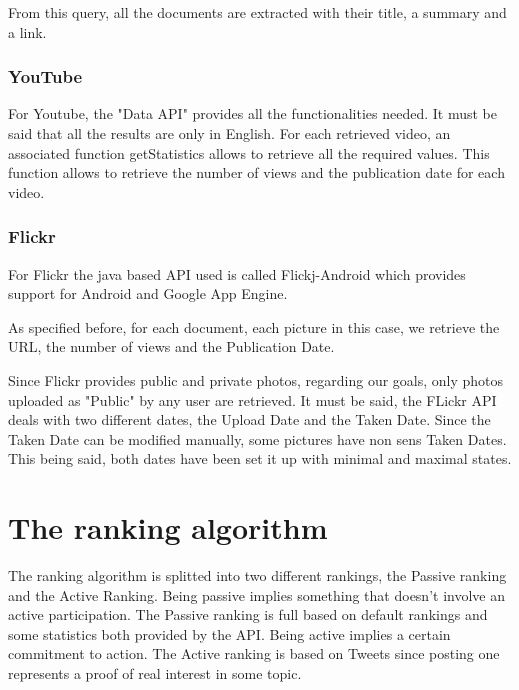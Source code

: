 \documentclass{acmsmall}
\begin{document}
From this query, all the documents are extracted with their title, a summary and a link.

\subsubsection{YouTube}
For Youtube, the "Data API" provides all the functionalities needed. It must be said that all the results are only in English. For each retrieved video, an associated function getStatistics allows to retrieve all the required values. This function allows to retrieve the number of views and the publication date for each video. 


\subsubsection{Flickr}
 For Flickr the java based API used is called Flickj-Android which provides support for Android and Google App Engine. 

 As specified before, for each document, each picture in this case, we retrieve the URL, the number of views and the Publication Date.

 Since Flickr provides public and private photos, regarding our goals, only photos uploaded as "Public" by any user are retrieved. 
 It must be said, the FLickr API deals with two different dates, the Upload Date and the Taken Date. Since the Taken Date can be modified manually, some pictures have non sens Taken Dates. This being said, both dates have been set it up with minimal and maximal states.




\section{The ranking algorithm}

The ranking algorithm is splitted into two different rankings, the Passive ranking and the Active Ranking. Being passive implies something that doesn't involve an active participation. The Passive ranking is full based on default rankings and some statistics both provided by the API. Being active implies a certain commitment to action. The Active ranking is based on Tweets since posting one represents a proof of real interest in some topic. 
\end{document}
